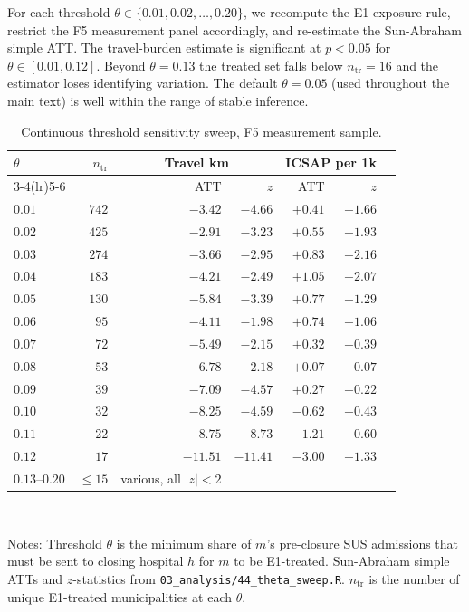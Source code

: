 For each
threshold $\theta \in \{0.01, 0.02, \ldots, 0.20\}$, we recompute the
E1 exposure rule, restrict the F5 measurement panel accordingly, and
re-estimate the Sun-Abraham simple ATT. The travel-burden estimate
is significant at $p < 0.05$ for $\theta \in [0.01, 0.12]$. Beyond
$\theta = 0.13$ the treated set falls below $n_{\text{tr}} = 16$ and
the estimator loses identifying variation. The default
$\theta = 0.05$ (used throughout the main text) is well within the
range of stable inference.

\begin{table}[h!]
\centering
\caption{Continuous threshold sensitivity sweep, F5 measurement sample.}
\label{tab:theta-sweep}
\begin{tabular}{lrrrrrr}
\toprule
$\theta$ & $n_{\text{tr}}$ &
\multicolumn{2}{c}{Travel km} & \multicolumn{2}{c}{ICSAP per 1k} &  \\
\cmidrule(lr){3-4}\cmidrule(lr){5-6}
& & ATT & $z$ & ATT & $z$ & \\
\midrule
$0.01$ & $742$ & $-3.42$ & $-4.66$ & $+0.41$ & $+1.66$ & \\
$0.02$ & $425$ & $-2.91$ & $-3.23$ & $+0.55$ & $+1.93$ & \\
$0.03$ & $274$ & $-3.66$ & $-2.95$ & $+0.83$ & $+2.16$ & \\
$0.04$ & $183$ & $-4.21$ & $-2.49$ & $+1.05$ & $+2.07$ & \\
$0.05$ & $130$ & $-5.84$ & $-3.39$ & $+0.77$ & $+1.29$ & \\
$0.06$ & $ 95$ & $-4.11$ & $-1.98$ & $+0.74$ & $+1.06$ & \\
$0.07$ & $ 72$ & $-5.49$ & $-2.15$ & $+0.32$ & $+0.39$ & \\
$0.08$ & $ 53$ & $-6.78$ & $-2.18$ & $+0.07$ & $+0.07$ & \\
$0.09$ & $ 39$ & $-7.09$ & $-4.57$ & $+0.27$ & $+0.22$ & \\
$0.10$ & $ 32$ & $-8.25$ & $-4.59$ & $-0.62$ & $-0.43$ & \\
$0.11$ & $ 22$ & $-8.75$ & $-8.73$ & $-1.21$ & $-0.60$ & \\
$0.12$ & $ 17$ & $-11.51$ & $-11.41$ & $-3.00$ & $-1.33$ & \\
$0.13$--$0.20$ & $\le 15$ & various, all $|z| < 2$ & & & & \\
\bottomrule
\end{tabular}
\\[0.5em]
\begin{minipage}{0.95\textwidth}
\footnotesize Notes: Threshold $\theta$ is the minimum share of
$m$'s pre-closure SUS admissions that must be sent to closing
hospital $h$ for $m$ to be E1-treated. Sun-Abraham simple ATTs and
$z$-statistics from \texttt{03\_analysis/44\_theta\_sweep.R}.
$n_{\text{tr}}$ is the number of unique E1-treated municipalities at
each $\theta$.
\end{minipage}
\end{table}

